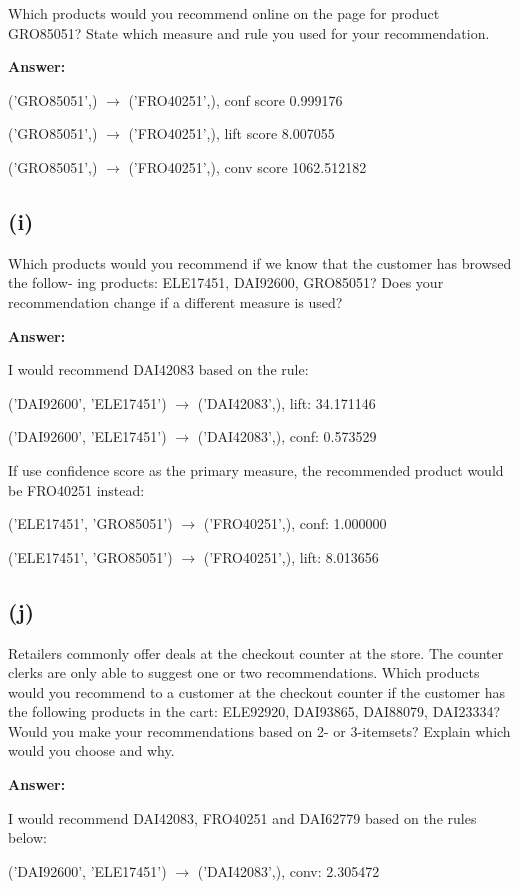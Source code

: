 \documentclass{article}
\begin{document}
Which products would you recommend online on the page for product GRO85051? State
which measure and rule you used for your recommendation.

\textbf{Answer:}

('GRO85051',) $\rightarrow$ ('FRO40251',), conf score 0.999176

('GRO85051',) $\rightarrow$ ('FRO40251',), lift score 8.007055

('GRO85051',) $\rightarrow$ ('FRO40251',), conv score 1062.512182


\subsection{(i)}

Which products would you recommend if we know that the customer has browsed the follow-
ing products: ELE17451, DAI92600, GRO85051? Does your recommendation change if
a different measure is used?

\textbf{Answer:}

I would recommend DAI42083  based on the rule:

('DAI92600', 'ELE17451') $\rightarrow$ ('DAI42083',), lift: 34.171146

('DAI92600', 'ELE17451') $\rightarrow$ ('DAI42083',), conf: 0.573529


If use confidence score as the primary measure, the recommended product would be FRO40251 instead:

('ELE17451', 'GRO85051') $\rightarrow$ ('FRO40251',), conf: 1.000000

('ELE17451', 'GRO85051') $\rightarrow$ ('FRO40251',), lift: 8.013656


\subsection{(j)}

Retailers commonly offer deals at the checkout counter at the store. The counter clerks are
only able to suggest one or two recommendations. Which products would you recommend
to a customer at the checkout counter if the customer has the following products in the cart:
ELE92920, DAI93865, DAI88079, DAI23334? Would you make your recommendations
based on 2- or 3-itemsets? Explain which would you choose and why.

\textbf{Answer:}

I would recommend DAI42083, FRO40251 and DAI62779 based on the rules below:

('DAI92600', 'ELE17451') $\rightarrow$ ('DAI42083',), conv: 2.305472
\end{document}
